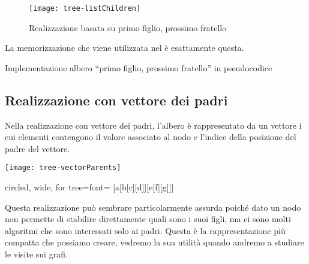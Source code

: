 \begin{figure}[H]
	\centering
	\texttt{[image: tree-listChildren]}
	\caption[Realizzazione di un albero tramite primo figlio, prossimo fratello]{Realizzazione basata su primo figlio, prossimo fratello}
	\label{fig:tree-list-children}
\end{figure}

La memorizzazione che viene utilizzata nel  è esattamente questa.

\begin{algorithm}[H]
	\caption{Implementazione albero \enquote{primo figlio, prossimo fratello} in pseudocodice}
	
\end{algorithm}

\newpage
\subsection{Realizzazione con vettore dei padri}

Nella realizzazione con vettore dei padri, l'albero è rappresentato da un vettore i cui elementi contengono il valore associato al nodo e l'indice della posizione del padre del vettore.

\bigskip
\begin{minipage}[c]{.5\textwidth}
	\centering
	\texttt{[image: tree-vectorParents]}
\end{minipage}%
\begin{minipage}[c]{.5\textwidth}
	\centering
	\begin{forest} circled, wide, for tree={font=\scshape}
	[a[b[c][d]][e[f][g]]]
	\end{forest}
\end{minipage}

\bigskip
Questa realizzazione può sembrare particolarmente assurda poiché dato un nodo non permette di stabilire direttamente quali sono i suoi figli, ma ci sono molti algoritmi che sono interessati solo ai padri.
Questa è la rappresentazione più compatta che possiamo creare, vedremo la sua utilità quando andremo a studiare le visite sui grafi.

\ifsubfile

\fi
